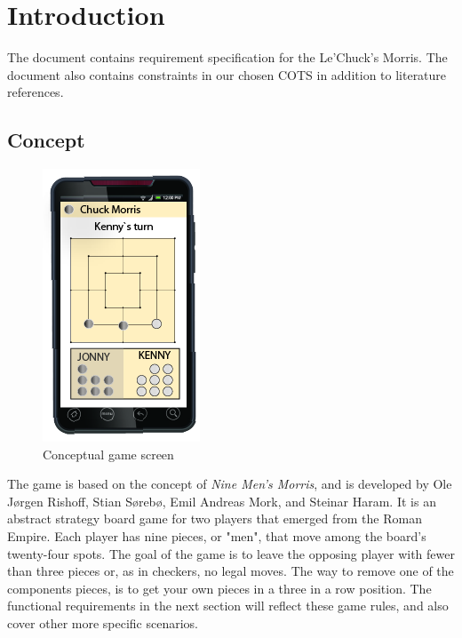 \section{Introduction}

The document contains requirement specification for the Le'Chuck's Morris. The document also contains constraints in our chosen COTS in addition to literature references.

\subsection{Concept}

\begin{figure}
\vspace{-30pt}
\begin{center}
\includegraphics{concept.png}
\end{center}
\caption{Conceptual game screen}

\end{figure}


The game is based on the concept of \emph{Nine Men's Morris}, and is \newline developed by Ole Jørgen Rishoff, Stian Sørebø, Emil Andreas Mork, and Steinar Haram.
It is an abstract strategy board game for two players that emerged from the Roman Empire. Each player has nine pieces, or "men", that move among the board's twenty-four spots. The goal of the game is to leave the opposing player with fewer than three pieces or, as in checkers, no legal moves. The way to remove one of the components pieces, is to get your own pieces in a three in a row position. The functional requirements in the next section will reflect these game rules, and also cover other more specific scenarios. 

\pagebreak



